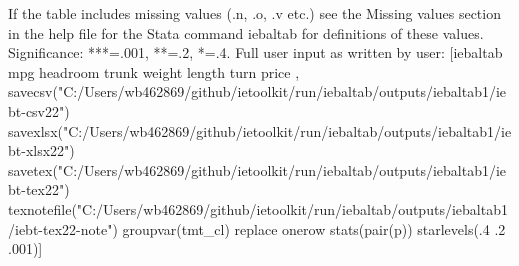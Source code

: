 If the table includes missing values (.n, .o, .v etc.) see the Missing values section in the help file for the Stata command iebaltab for definitions of these values. Significance: ***=.001, **=.2, *=.4. Full user input as written by user: [iebaltab mpg headroom trunk weight length turn price , savecsv("C:/Users/wb462869/github/ietoolkit/run/iebaltab/outputs/iebaltab1/iebt-csv22") savexlsx("C:/Users/wb462869/github/ietoolkit/run/iebaltab/outputs/iebaltab1/iebt-xlsx22") savetex("C:/Users/wb462869/github/ietoolkit/run/iebaltab/outputs/iebaltab1/iebt-tex22") texnotefile("C:/Users/wb462869/github/ietoolkit/run/iebaltab/outputs/iebaltab1/iebt-tex22-note") groupvar(tmt\_cl) replace onerow stats(pair(p)) starlevels(.4 .2 .001)] 
